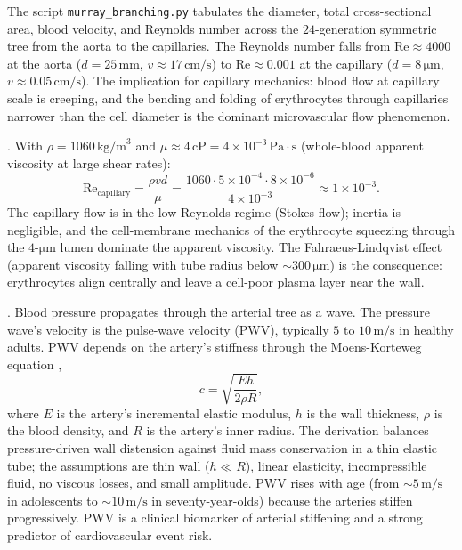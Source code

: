 

The script \texttt{murray\_branching.py} tabulates the diameter,
total cross-sectional area, blood velocity, and Reynolds number
across the $24$-generation symmetric tree from the aorta to the
capillaries. The Reynolds number falls from $\text{Re} \approx 4000$
at the aorta ($d = 25\,\text{mm}$, $v \approx 17\,\text{cm/s}$) to
$\text{Re} \approx 0.001$ at the capillary
($d = 8\,\si{\micro\meter}$, $v \approx 0.05\,\text{cm/s}$). The
implication for capillary mechanics: blood flow at capillary scale
is creeping, and the bending and folding of erythrocytes through
capillaries narrower than the cell diameter is the dominant
microvascular flow phenomenon.

. With $\rho = 1060\,\text{kg/m}^3$
and $\mu \approx 4\,\text{cP} = 4 \times 10^{-3}\,\text{Pa}\cdot\text{s}$
(whole-blood apparent viscosity at large shear rates):
\[
\text{Re}_{\text{capillary}} = \frac{\rho v d}{\mu}
= \frac{1060 \cdot 5\times 10^{-4} \cdot 8\times 10^{-6}}{4\times 10^{-3}}
\approx 1 \times 10^{-3}.
\]
The capillary flow is in the low-Reynolds regime (Stokes flow);
inertia is negligible, and the cell-membrane mechanics of the
erythrocyte squeezing through the $4$-$\si{\micro\meter}$ lumen
dominate the apparent viscosity. The Fahraeus-Lindqvist effect
(apparent viscosity falling with tube radius below
$\sim 300\,\si{\micro\meter}$) is the consequence: erythrocytes
align centrally and leave a cell-poor plasma layer near the wall.

.
Blood pressure propagates through the arterial tree as a wave. The
pressure wave's velocity is the pulse-wave velocity (PWV), typically
$5$ to $10\,\text{m}/\text{s}$ in healthy adults. PWV depends on the
artery's stiffness through the Moens-Korteweg equation
\cite[p.~538]{paper:v6c06-korteweg-1878},
\cite[p.~24]{paper:v6c06-moens-1878}
\[
c = \sqrt{\frac{E h}{2 \rho R}},
\]
where $E$ is the artery's incremental elastic modulus, $h$ is the
wall thickness, $\rho$ is the blood density, and $R$ is the artery's
inner radius. The derivation balances pressure-driven wall
distension against fluid mass conservation in a thin elastic tube;
the assumptions are thin wall ($h \ll R$), linear elasticity,
incompressible fluid, no viscous losses, and small amplitude. PWV
rises with age (from $\sim 5\,\text{m}/\text{s}$ in adolescents to
$\sim 10\,\text{m}/\text{s}$ in seventy-year-olds) because the
arteries stiffen progressively. PWV is a clinical biomarker of
arterial stiffening and a strong predictor of cardiovascular event
risk.

